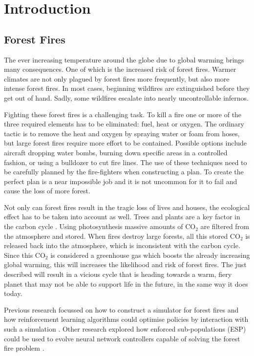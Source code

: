 
\section{Introduction}\label{sec:introduction}

\subsection{Forest Fires}
The ever increasing temperature around the globe due to global warming brings many consequences. One of which is the increased risk of forest fires. Warmer climates are not only plagued by forest fires more frequently, but also more intense forest fires.  In most cases, beginning wildfires are extinguished before they get out of hand. Sadly, some wildfires escalate into nearly uncontrollable infernos.

Fighting these forest fires is a challenging task. To kill a fire one or more of the three required elements has to be eliminated: fuel, heat or oxygen. The ordinary tactic is to remove the heat and oxygen by spraying water or foam from hoses, but large forest fires require more effort to be contained. Possible options include aircraft dropping water bombs, burning down specific areas in a controlled fashion, or using a bulldozer to cut fire lines. The use of these techniques need to be carefully planned by the fire-fighters when constructing a plan. To create the perfect plan is a near impossible job and it is not uncommon for it to fail and cause the loss of more forest.

Not only can forest fires result in the tragic loss of lives and houses, the ecological effect has to be taken into account as well. Trees and plants are a key factor in the carbon cycle \citep{kasischke1995fire}. Using photosynthesis massive amounts of CO$_{2}$ are filtered from the atmosphere and stored. When fires destroy large forests, all this stored CO$_{2}$ is released back into the atmosphere, which is inconsistent with the carbon cycle. Since this CO$_{2}$ is considered a greenhouse gas \citep{houghton1991climate} which boosts the already increasing global warming, this will increases the likelihood and risk of forest fires. The just described will result in a vicious cycle that is heading towards a warm, fiery planet that may not be able to support life in the future, in the same way it does today. 

Previous research focussed on how to construct a simulator for forest fires and how reinforcement learning algorithms could optimise policies by interaction with such a simulation \citep{wiering1998learning}. Other research explored how enforced sub-populations (ESP) could be used to evolve neural network controllers capable of solving the forest fire problem \citep{wiering2005evolving}.

